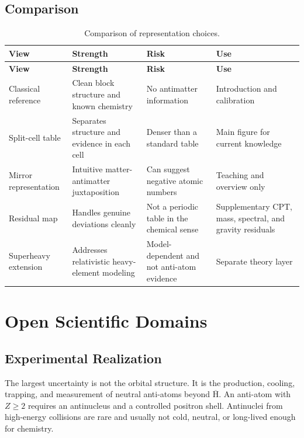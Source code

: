 \documentclass[11pt,a4paper]{article}
\newcommand{\antiH}{\ensuremath{\overline{\mathrm{H}}}}
\begin{document}


\subsection{Comparison}

\begin{longtable}{L{0.17\textwidth}L{0.23\textwidth}L{0.24\textwidth}L{0.22\textwidth}}
\caption{Comparison of representation choices.}\label{tab:variant-comparison}\\
\toprule
\textbf{View} & \textbf{Strength} & \textbf{Risk} & \textbf{Use}\\
\midrule
\endfirsthead
\toprule
\textbf{View} & \textbf{Strength} & \textbf{Risk} & \textbf{Use}\\
\midrule
\endhead
Classical reference & Clean block structure and known chemistry & No antimatter information & Introduction and calibration\\
Split-cell table & Separates structure and evidence in each cell & Denser than a standard table & Main figure for current knowledge\\
Mirror representation & Intuitive matter-antimatter juxtaposition & Can suggest negative atomic numbers & Teaching and overview only\\
Residual map & Handles genuine deviations cleanly & Not a periodic table in the chemical sense & Supplementary CPT, mass, spectral, and gravity residuals\\
Superheavy extension & Addresses relativistic heavy-element modeling & Model-dependent and not anti-atom evidence & Separate theory layer\\
\bottomrule
\end{longtable}

\section{Open Scientific Domains}

\subsection{Experimental Realization}

The largest uncertainty is not the orbital structure. It is the production, cooling, trapping, and measurement of neutral anti-atoms beyond \antiH{}. An anti-atom with $Z\geq2$ requires an antinucleus and a controlled positron shell. Antinuclei from high-energy collisions are rare and usually not cold, neutral, or long-lived enough for chemistry.
\end{document}
